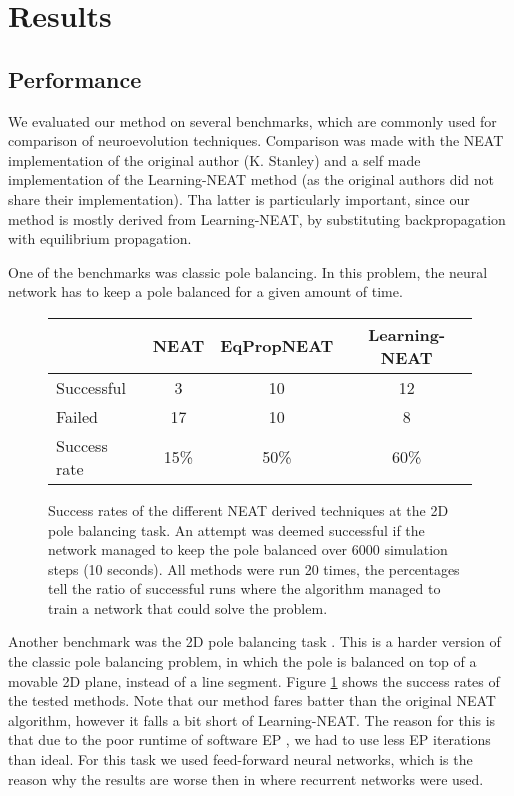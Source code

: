 \documentclass[lettersize,journal]{IEEEtran}
\newcommand{\eqprop}{EP }
\begin{document}
		\section{Results}
        \subsection{Performance}
        We evaluated our method on several benchmarks, which are commonly used for comparison of neuroevolution techniques. Comparison was made with the NEAT implementation of the original author (K. Stanley) \cite{neatcpp} and a self made implementation of the Learning-NEAT method \cite{lneat} (as the original authors did not share their implementation). Tha latter is particularly important, since our method is mostly derived from Learning-NEAT, by substituting backpropagation with equilibrium propagation.

        One of the benchmarks was classic pole balancing. In this problem, the neural network has to keep a pole balanced for a given amount of time.

        \begin{figure}
            \centering
            \begin{tabular}{|l||c|c|c|}
            \hline
           & NEAT & EqPropNEAT & Learning-NEAT \\
                \hline\hline
               Successful & 3& 10& 12\\\hline
               Failed & 17& 10 & 8 \\\hline
               Success rate & 15\% & 50\% & 60\%\\\hline
            \end{tabular}
            \caption{Success rates of the different NEAT derived techniques at the 2D pole balancing task. An attempt was deemed successful if the network managed to keep the pole balanced over 6000 simulation steps (10 seconds). All methods were run 20 times, the percentages tell the ratio of successful runs where the algorithm managed to train a network that could solve the problem.}
            \label{fig:rates-2dpole}
        \end{figure}

        Another benchmark was the 2D pole balancing task \cite{pole2d}. This is a harder version of the classic pole balancing problem, in which the pole is balanced on top of a movable 2D plane, instead of a line segment. Figure \ref{fig:rates-2dpole} shows the success rates of the tested methods. Note that our method fares batter than the original NEAT algorithm, however it falls a bit short of Learning-NEAT. The reason for this is that due to the poor runtime of software \eqprop, we had to use less \eqprop iterations than ideal. For this task we used feed-forward neural networks, which is the reason why the results are worse then in \cite{pole2d} where recurrent networks were used. 
    
\end{document}
